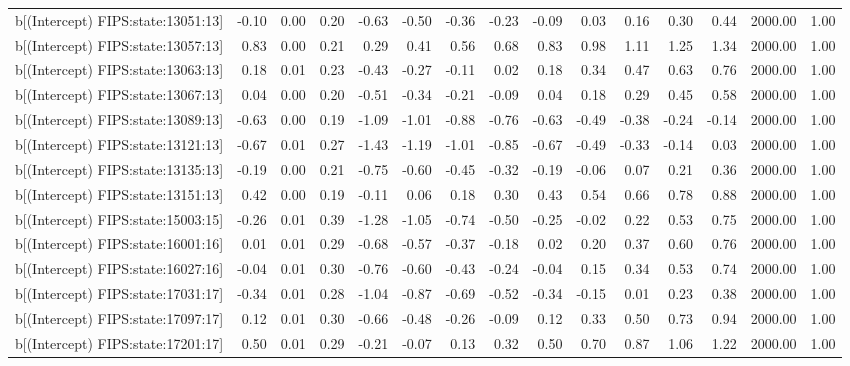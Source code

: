\begin{table}[ht]
\begin{tabular}{rrrrrrrrrrrrrrr}
  b[(Intercept) FIPS:state:13051:13] & -0.10 & 0.00 & 0.20 & -0.63 & -0.50 & -0.36 & -0.23 & -0.09 & 0.03 & 0.16 & 0.30 & 0.44 & 2000.00 & 1.00 \\ 
  b[(Intercept) FIPS:state:13057:13] & 0.83 & 0.00 & 0.21 & 0.29 & 0.41 & 0.56 & 0.68 & 0.83 & 0.98 & 1.11 & 1.25 & 1.34 & 2000.00 & 1.00 \\ 
  b[(Intercept) FIPS:state:13063:13] & 0.18 & 0.01 & 0.23 & -0.43 & -0.27 & -0.11 & 0.02 & 0.18 & 0.34 & 0.47 & 0.63 & 0.76 & 2000.00 & 1.00 \\ 
  b[(Intercept) FIPS:state:13067:13] & 0.04 & 0.00 & 0.20 & -0.51 & -0.34 & -0.21 & -0.09 & 0.04 & 0.18 & 0.29 & 0.45 & 0.58 & 2000.00 & 1.00 \\ 
  b[(Intercept) FIPS:state:13089:13] & -0.63 & 0.00 & 0.19 & -1.09 & -1.01 & -0.88 & -0.76 & -0.63 & -0.49 & -0.38 & -0.24 & -0.14 & 2000.00 & 1.00 \\ 
  b[(Intercept) FIPS:state:13121:13] & -0.67 & 0.01 & 0.27 & -1.43 & -1.19 & -1.01 & -0.85 & -0.67 & -0.49 & -0.33 & -0.14 & 0.03 & 2000.00 & 1.00 \\ 
  b[(Intercept) FIPS:state:13135:13] & -0.19 & 0.00 & 0.21 & -0.75 & -0.60 & -0.45 & -0.32 & -0.19 & -0.06 & 0.07 & 0.21 & 0.36 & 2000.00 & 1.00 \\ 
  b[(Intercept) FIPS:state:13151:13] & 0.42 & 0.00 & 0.19 & -0.11 & 0.06 & 0.18 & 0.30 & 0.43 & 0.54 & 0.66 & 0.78 & 0.88 & 2000.00 & 1.00 \\ 
  b[(Intercept) FIPS:state:15003:15] & -0.26 & 0.01 & 0.39 & -1.28 & -1.05 & -0.74 & -0.50 & -0.25 & -0.02 & 0.22 & 0.53 & 0.75 & 2000.00 & 1.00 \\ 
  b[(Intercept) FIPS:state:16001:16] & 0.01 & 0.01 & 0.29 & -0.68 & -0.57 & -0.37 & -0.18 & 0.02 & 0.20 & 0.37 & 0.60 & 0.76 & 2000.00 & 1.00 \\ 
  b[(Intercept) FIPS:state:16027:16] & -0.04 & 0.01 & 0.30 & -0.76 & -0.60 & -0.43 & -0.24 & -0.04 & 0.15 & 0.34 & 0.53 & 0.74 & 2000.00 & 1.00 \\ 
  b[(Intercept) FIPS:state:17031:17] & -0.34 & 0.01 & 0.28 & -1.04 & -0.87 & -0.69 & -0.52 & -0.34 & -0.15 & 0.01 & 0.23 & 0.38 & 2000.00 & 1.00 \\ 
  b[(Intercept) FIPS:state:17097:17] & 0.12 & 0.01 & 0.30 & -0.66 & -0.48 & -0.26 & -0.09 & 0.12 & 0.33 & 0.50 & 0.73 & 0.94 & 2000.00 & 1.00 \\ 
  b[(Intercept) FIPS:state:17201:17] & 0.50 & 0.01 & 0.29 & -0.21 & -0.07 & 0.13 & 0.32 & 0.50 & 0.70 & 0.87 & 1.06 & 1.22 & 2000.00 & 1.00 \\ 

\end{tabular}
\end{table}
